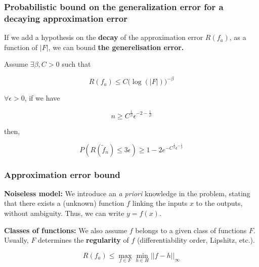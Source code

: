 \documentclass[
10pt, %
a4paper, %
oneside, %
headinclude,footinclude, %
BCOR5mm, %
]{scrartcl}
\begin{document}
    \subsubsection{\large\color{Periwinkle}Probabilistic bound on the generalization error for a decaying approximation error}

    If we add a hypothesis on the \textbf{{decay}} of the approximation error $ R(f_a)$, as a function of $|F|$, we can bound \textbf{{the generelisation error.}} 

    \begin{proposition}
	\label{prop:decay_approx}

	Assume $\exists \beta , C >0$ such that

	\begin{equation}
	    \label{eq:decay}
	    R(f_a)\leq C\big( \log(|F|) \big)^{-\beta}
	\end{equation}

	$\forall \epsilon >0$, if we have

	\begin{equation*}
	    n\geq C^{ \frac{1}{ \beta} } \epsilon^{-2- \frac{1}{\beta} }
	\end{equation*}

	then,

	\begin{equation*}
	    P(R( \tilde{f}_n)\leq 3\epsilon)\geq 1-2e^{ - C^{ \frac{1}{\beta} }\epsilon^{- \frac{1}{\beta} }}
	\end{equation*}
        
    \end{proposition}

    \subsubsection{\large\color{Periwinkle}Approximation error bound}

    \textbf{{Noiseless model:}} We introduce an \textit{{a priori}} knowledge in the problem, stating that there exists a (unknown) function $f$ linking the inputs $x$ to the outputs, without ambiguity. Thus, we can write $y=f(x)$.

    \textbf{{Classes of functions:}} We also assume $f$ belongs to a given class of functions $F$. Usually, $F$ determines the \textbf{{regularity }} of $f$ (differentiability order, Lipshitz, etc.).

    \begin{equation*}
	R(f_a)\leq \max_{f\in F}\min_{h\in H}||f-h||_{\infty}
    \end{equation*}
\end{document}
